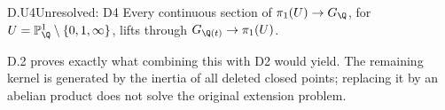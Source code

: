 \begin{claim}{D.U4}{Unresolved: D4}
Every continuous section of $\pi_1(U)\to G_\Q$, for
$U=\mathbb P^1_\Q\setminus\{0,1,\infty\}$, lifts through
$G_{\Q(t)}\to\pi_1(U)$.
\end{claim}
D.2 proves exactly what combining this with D2 would yield.
The remaining kernel is generated by the inertia of all deleted
closed points; replacing it by an abelian product does not solve
the original extension problem.

